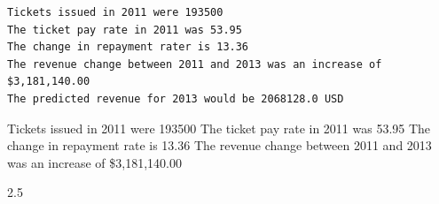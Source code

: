 \documentclass[
  letterpaper,
  DIV=11,
  numbers=noendperiod]{scrartcl}
\newenvironment{Shaded}{\begin{snugshade}}{\end{snugshade}}
\newcommand{\BuiltInTok}[1]{\textcolor[rgb]{0.00,0.23,0.31}{#1}}
\newcommand{\DecValTok}[1]{\textcolor[rgb]{0.68,0.00,0.00}{#1}}
\newcommand{\FloatTok}[1]{\textcolor[rgb]{0.68,0.00,0.00}{#1}}
\newcommand{\NormalTok}[1]{\textcolor[rgb]{0.00,0.23,0.31}{#1}}
\newcommand{\OperatorTok}[1]{\textcolor[rgb]{0.37,0.37,0.37}{#1}}
\newcommand{\SpecialCharTok}[1]{\textcolor[rgb]{0.37,0.37,0.37}{#1}}
\newcommand{\SpecialStringTok}[1]{\textcolor[rgb]{0.13,0.47,0.30}{#1}}
\newcommand{\StringTok}[1]{\textcolor[rgb]{0.13,0.47,0.30}{#1}}
\begin{document}
\begin{Shaded}
\end{Shaded}

\begin{verbatim}
Tickets issued in 2011 were 193500
The ticket pay rate in 2011 was 53.95
The change in repayment rater is 13.36
The revenue change between 2011 and 2013 was an increase of $3,181,140.00
The predicted revenue for 2013 would be 2068128.0 USD
\end{verbatim}

Tickets issued in 2011 were 193500 The ticket pay rate in 2011 was 53.95
The change in repayment rate is 13.36 The revenue change between 2011
and 2013 was an increase of \$3,181,140.00

2.5
\end{document}
